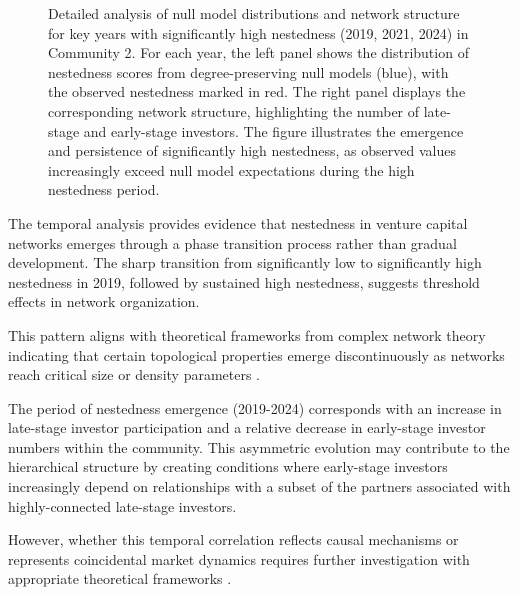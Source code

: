 \begin{figure}[htbp]
\caption{Detailed analysis of null model distributions and network structure for key years with significantly high nestedness (2019, 2021, 2024) in Community 2. For each year, the left panel shows the distribution of nestedness scores from degree-preserving null models (blue), with the observed nestedness marked in red. The right panel displays the corresponding network structure, highlighting the number of late-stage and early-stage investors. The figure illustrates the emergence and persistence of significantly high nestedness, as observed values increasingly exceed null model expectations during the high nestedness period.}
\label{fig:null_model_distributions_significant_years}
\end{figure}

The temporal analysis provides evidence that nestedness in venture capital networks emerges through a phase transition process rather than gradual development. The sharp transition from significantly low to significantly high nestedness in 2019, followed by sustained high nestedness, suggests threshold effects in network organization. 

This pattern aligns with theoretical frameworks from complex network theory indicating that certain topological properties emerge discontinuously as networks reach critical size or density parameters \cite{Mariani2019}.


The period of nestedness emergence (2019-2024) corresponds with an increase in late-stage investor participation and a relative decrease in early-stage investor numbers within the community. This asymmetric evolution may contribute to the hierarchical structure by creating conditions where early-stage investors increasingly depend on relationships with a subset of the partners associated with highly-connected late-stage investors. 


However, whether this temporal correlation reflects causal mechanisms or represents coincidental market dynamics requires further investigation with appropriate theoretical frameworks \cite{Dalle2025}.

\pagebreak